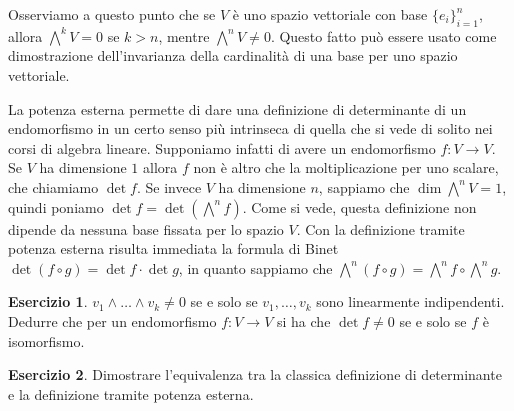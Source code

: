 \documentclass[11pt]{article}
\theoremstyle{plain}
\theoremstyle{definition}
\newtheorem{exercise}{Esercizio}[section]
\theoremstyle{remark}
\begin{document}
Osserviamo a questo punto che se $V$ è uno spazio vettoriale con base $\{e_i\}_{i=1}^n$, allora 
$\bigwedge^kV = 0$ se $k>n$, mentre $\bigwedge^nV\neq 0$. Questo fatto può essere usato
come dimostrazione dell'invarianza della cardinalità di una base per uno spazio vettoriale.

La potenza esterna permette di dare una definizione di determinante di un endomorfismo in un certo
senso più intrinseca di quella che si vede di solito nei corsi di algebra lineare.
Supponiamo infatti di avere un endomorfismo $f:V\to V$. Se $V$ ha dimensione $1$ allora $f$ non
è altro che la moltiplicazione per uno scalare, che chiamiamo $\det f$. Se invece $V$ ha dimensione $n$,
sappiamo che $\dim\bigwedge^nV=1$, quindi poniamo $\det f = \det(\bigwedge^nf)$.
Come si vede, questa definizione non dipende da nessuna base fissata per lo spazio $V$.
Con la definizione tramite potenza esterna risulta immediata la formula di Binet $\det (f\circ g) = \det f \cdot \det g$, in quanto
sappiamo che $\bigwedge^n(f\circ g) = \bigwedge^nf \circ \bigwedge^ng$.
\begin{exercise}
$v_1\wedge \dots \wedge v_k \neq 0$ se e solo se $v_1,\dots,v_k$ sono linearmente indipendenti.
Dedurre che per un endomorfismo $f:V\to V$ si ha che $\det f\neq 0$ se e solo se $f$ è isomorfismo.
\end{exercise}
\begin{exercise}
Dimostrare l'equivalenza tra la classica definizione di determinante e la definizione tramite potenza esterna.
\end{exercise}
\end{document}
